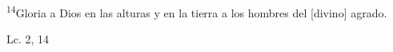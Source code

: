 \documentclass[../../rosario.tex]{subfiles}
\begin{document}
    \textsuperscript{14}Gloria a Dios en las alturas y en la tierra a los hombres del [divino] agrado.
    \begin{flushright}
    Lc. 2, 14        
    \end{flushright}
\end{document}
